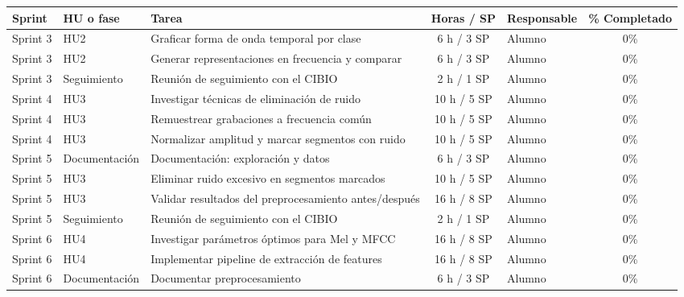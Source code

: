 \documentclass[
11pt, %
]{charter}
\begin{document}
\begin{table}[htpb]
\centering
\begin{tabularx}{\linewidth}{@{}|l|l|X|c|l|c|@{}}
\hline
\rowcolor[HTML]{C0C0C0}
Sprint & HU o fase & Tarea & Horas / SP & Responsable & \% Completado \\ \hline
Sprint 3 & HU2 & Graficar forma de onda temporal por clase & 6 h / 3 SP & Alumno & 0\% \\ \hline
Sprint 3 & HU2 & Generar representaciones en frecuencia y comparar & 6 h / 3 SP & Alumno & 0\% \\ \hline
Sprint 3 & Seguimiento & Reunión de seguimiento con el CIBIO & 2 h / 1 SP & Alumno & 0\% \\ \hline
Sprint 4 & HU3 & Investigar técnicas de eliminación de ruido & 10 h / 5 SP & Alumno & 0\% \\ \hline
Sprint 4 & HU3 & Remuestrear grabaciones a frecuencia común & 10 h / 5 SP & Alumno & 0\% \\ \hline
Sprint 4 & HU3 & Normalizar amplitud y marcar segmentos con ruido & 10 h / 5 SP & Alumno & 0\% \\ \hline
Sprint 5 & Documentación & Documentación: exploración y datos & 6 h / 3 SP & Alumno & 0\% \\ \hline
Sprint 5 & HU3 & Eliminar ruido excesivo en segmentos marcados & 10 h / 5 SP & Alumno & 0\% \\ \hline
Sprint 5 & HU3 & Validar resultados del preprocesamiento antes/después & 16 h / 8 SP & Alumno & 0\% \\ \hline
Sprint 5 & Seguimiento & Reunión de seguimiento con el CIBIO & 2 h / 1 SP & Alumno & 0\% \\ \hline
Sprint 6 & HU4 & Investigar parámetros óptimos para Mel y MFCC & 16 h / 8 SP & Alumno & 0\% \\ \hline
Sprint 6 & HU4 & Implementar pipeline de extracción de features & 16 h / 8 SP & Alumno & 0\% \\ \hline
Sprint 6 & Documentación & Documentar preprocesamiento & 6 h / 3 SP & Alumno & 0\% \\ \hline

\end{tabularx}
\end{table}
\end{document}
